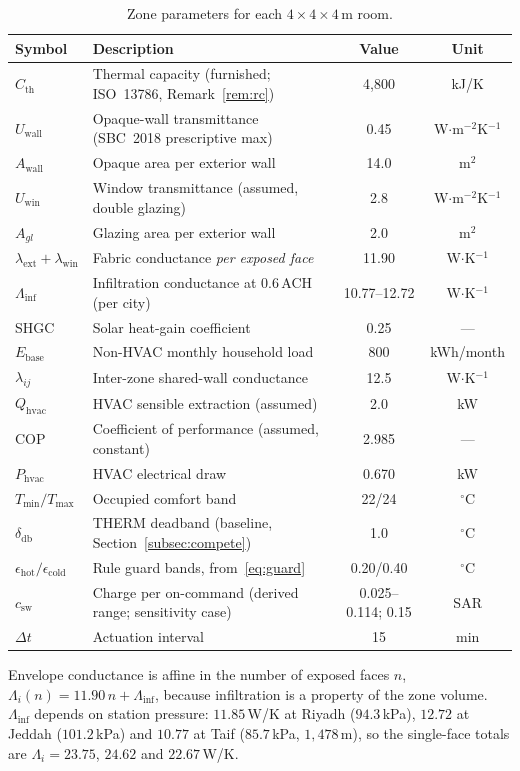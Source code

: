 \documentclass[3p,twocolumn,number]{elsarticle}
\newcommand{\Tmin}{T_{\min}}
\newcommand{\Tmax}{T_{\max}}
\newcommand{\deadband}{\delta_{\mathrm{db}}}
\newcommand{\Cth}{C_{\mathrm{th}}}
\newcommand{\lext}{\lambda_{\mathrm{ext}}}
\newcommand{\lwin}{\lambda_{\mathrm{win}}}
\newcommand{\lij}{\lambda_{ij}}
\newcommand{\Qhvac}{Q_{\mathrm{hvac}}}
\newcommand{\csw}{c_{\mathrm{sw}}}
\newcommand{\Phvac}{P_{\mathrm{hvac}}}
\begin{document}
\begin{table}[t]
\centering
\caption{Zone parameters for each $4\times4\times4\,\text{m}$ room.}
\label{tab:params}
\setlength{\tabcolsep}{4.5pt}
\begin{tabularx}{\linewidth}{lXcc}
\toprule
Symbol & Description & Value & Unit \\
\midrule
$\Cth$   & Thermal capacity (furnished; ISO~13786, Remark~\ref{rem:rc}) & 4{,}800 & kJ/K\\
$U_{\mathrm{wall}}$ & Opaque-wall transmittance (SBC~2018 prescriptive max) & 0.45 & W$\cdot$m$^{-2}$K$^{-1}$ \\
$A_{\mathrm{wall}}$ & Opaque area per exterior wall & 14.0 & m$^2$ \\
$U_{\mathrm{win}}$ & Window transmittance (assumed, double glazing) & 2.8 & W$\cdot$m$^{-2}$K$^{-1}$ \\
$A_{gl}$ & Glazing area per exterior wall            & 2.0 & m$^2$ \\
$\lext+\lwin$ & Fabric conductance \emph{per exposed face} & 11.90 & W$\cdot$K$^{-1}$ \\
$\Lambda_{\mathrm{inf}}$ & Infiltration conductance at $0.6\,$ACH (per city) & 10.77--12.72 & W$\cdot$K$^{-1}$ \\
SHGC     & Solar heat-gain coefficient               & 0.25 & --- \\
$E_{\mathrm{base}}$ & Non-HVAC monthly household load  & 800 & kWh/month \\
$\lij$   & Inter-zone shared-wall conductance         & 12.5 & W$\cdot$K$^{-1}$ \\
$\Qhvac$ & HVAC sensible extraction (assumed)        &  2.0 & kW \\
COP      & Coefficient of performance (assumed, constant) & 2.985 & --- \\
$\Phvac$ & HVAC electrical draw                       & 0.670 & kW \\
$\Tmin/\Tmax$ & Occupied comfort band                & 22/24 & $^\circ$C \\
$\deadband$ & THERM deadband (baseline, Section~\ref{subsec:compete}) & 1.0 & $^\circ$C \\
$\epsilon_{\mathrm{hot}}/\epsilon_{\mathrm{cold}}$ & Rule guard bands, from~\eqref{eq:guard} & 0.20/0.40 & $^\circ$C \\
$\csw$       & Charge per on-command (derived range; sensitivity case) & 0.025--0.114; 0.15 & SAR \\
$\Delta t$  & Actuation interval                      &   15 & min \\
\bottomrule
\end{tabularx}
\vspace{2pt}
{\footnotesize\raggedright
Envelope conductance is affine in the number of exposed faces $n$,
$\Lambda_i(n)=11.90\,n+\Lambda_{\mathrm{inf}}$, because infiltration is a
property of the zone volume. $\Lambda_{\mathrm{inf}}$ depends on station
pressure: $11.85\,$W/K at Riyadh ($94.3\,$kPa), $12.72$ at Jeddah
($101.2\,$kPa) and $10.77$ at Taif ($85.7\,$kPa, $1{,}478\,$m), so the
single-face totals are $\Lambda_i=23.75$, $24.62$ and $22.67\,$W/K.\par}
\end{table}
\end{document}
